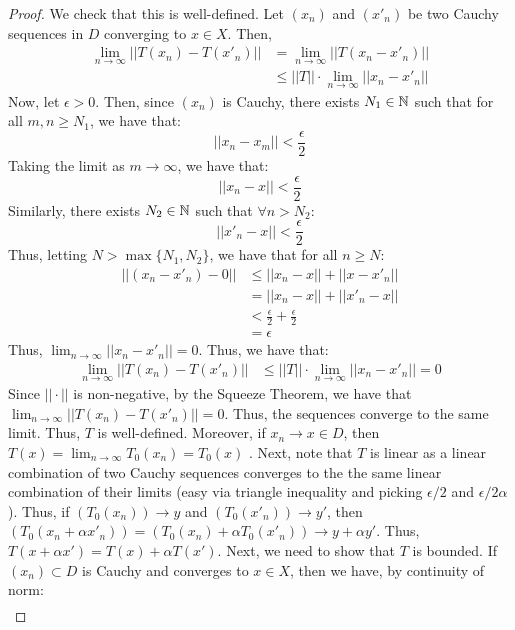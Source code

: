 \documentclass[12pt]{article}
\begin{document}
\begin{solution}
\begin{proof}
        We check that this is well-defined. Let $(x_n)$ and $(x'_n)$ be two Cauchy sequences in $D$ converging to $x \in X$. Then, 
        \begin{align*}
            \lim_{n\to \infty} ||T(x_n) - T(x'_n)|| &= \lim_{n \to \infty} ||T(x_n - x'_n)|| \\
            &\leq ||T||\cdot \lim_{n \to \infty} ||x_n - x'_n||
        \end{align*}
        Now, let $\epsilon > 0$. Then, since $(x_n)$ is Cauchy, there exists $N_1 \in \mathbb N$ such that for all $m, n \geq N_1$, we have that:
        \[ ||x_n - x_m|| < \frac{\epsilon}{2}\]
        Taking the limit as $m \to \infty$, we have that: 
        \[ ||x_n - x|| < \frac{\epsilon}{2}\]
        Similarly, there exists $N_2 \in \mathbb N$ such that $\forall n > N_2$: 
        \[||x'_n - x|| < \frac{\epsilon}{2}\]
        Thus, letting $N > \max\{N_1, N_2\}$, we have that for all $n \geq N$:
        \begin{align*}
            ||(x_n - x'_n) - 0|| &\leq ||x_n - x|| + ||x-x'_n|| \\
            &= ||x_n - x|| + ||x'_n-x|| \\
            &< \frac{\epsilon}{2} + \frac{\epsilon}{2} \\
            &= \epsilon 
        \end{align*}
        Thus, $\lim_{n \to \infty} ||x_n - x'_n|| = 0$. Thus, we have that:
        \begin{align*}
            \lim_{n\to \infty} ||T(x_n) - T(x'_n)|| &\leq ||T||\cdot \lim_{n \to \infty} ||x_n - x'_n|| = 0
        \end{align*}
        Since $||\cdot||$ is non-negative, by the Squeeze Theorem, we have that $\lim_{n \to \infty} ||T(x_n) - T(x'_n)|| = 0$. Thus, the sequences converge to the same limit. Thus, $T$ is well-defined. \bbni
        Moreover, if $x_n \to x \in D$, then $T(x) = \lim_{n \to \infty} T_0(x_n) = T_0(x)$ . \bbni 
        Next, note that $T$ is linear as a linear combination of two Cauchy sequences converges to the the same linear combination of their limits (easy via triangle inequality and picking $\epsilon/2$ and $\epsilon/2\alpha$). Thus, if $(T_0(x_n)) \to y$ and $(T_0(x'_n)) \to y'$, then $(T_0(x_n + \alpha x'_n)) = (T_0(x_n)+\alpha T_0(x'_n)) \to y + \alpha y'$. Thus, $T(x+\alpha x') = T(x) + \alpha T(x')$. \bbni
        Next, we need to show that $T$ is bounded. If $(x_n) \subset D$ is Cauchy and converges to $x \in X$, then we have, by continuity of norm: 
        \begin{align*}

\end{align*}
\end{proof}
\end{solution}
\end{document}
